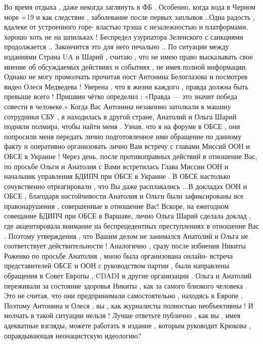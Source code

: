 Во время отдыха , даже некогда заглянуть в ФБ . Особенно, когда вода в Черном
море +19 и как следствие , заболевание после первых заплывов ..Одна радость ,
вдалеке от устроенного горе- властью трэша с незалежностью и платформами,
хорошо хоть не на шпильках ! Беспредел узурпатора Зеленского  с санкциями
продолжается .. Закончится это для него печально .. По ситуации между изданиями
Страна UA и Шарий , считаю , что не имею право высказывать свое мнение об
обсуждаемых действиях и событиях , не имея полной информации. Однако не могу
промолчать прочитав пост Антонина Белоглазова и  посмотрев видео Олеся
Медведева ! Уверена , что в жизни каждого , правда должна быть превыше всего !
Пришвин чётко определил : «Правда — это значит победа совести в человеке.»
Когда Вас Антонина незаконно затолкали в машину сотрудники СБУ , я находилась в
другой стране, Анатолий и Ольга Шарий подняли полмира, чтобы найти меня .
Узнав, что я на форуме в ОБСЕ , они попросили меня передать лично
подготовленное ими обращение по данному факту и оперативно организовать лично
Вам встречу с главами Миссий ООН и ОБСЕ в Украине ! Через день, после
противоправных действий в отношение Вас, по просьбе Ольги и Анатолия  с Вами
встретилась Глава Миссии ООН и начальник управления БДИПЧ при ОБСЕ в Украине .
В ОБСЕ настолько сочувственно отреагировали , что Вы даже расплакались ...В
докладах ООН и ОБСЕ , благодаря настойчивости Анатолия и Ольги были
зафиксированы все  правонарушения , совершенные в отношение Вас! Вскоре,  на
ежегодном совещание БДИПЧ при ОБСЕ в Варшаве, лично  Ольга Шарий сделала доклад
, где акцентировала внимание на беспрецедентных преступлениях в отношение Вас .
Поэтому утверждения , что Вашим делом не занимался Анатолий и Ольга не
соответствует действительности ! Аналогично , сразу после избиения Никиты
Роженко по просьбе Анатолия , мною была организована онлайн- встреча
представителей ОБСЕ и ООН  с руководством партии , были направлены обращения в
Совет Европы , CDADI и другие организации . Ольга и Анатолий переживали за
состояние здоровья Никиты , как за самого близкого человека . Это не считая,
что они предпринимали самостоятельно , находясь в Европе . Поэтому Антонина и
Олеся , вы , как журналисты полностью необъективны ! И молчать в такой ситуации
нельзя ! Лучше ответьте публично , как вы , имея адекватные взгляды, можете
работать в издание , которым руководит Крюкова , оправдывающая неонацистскую
идеологию?

